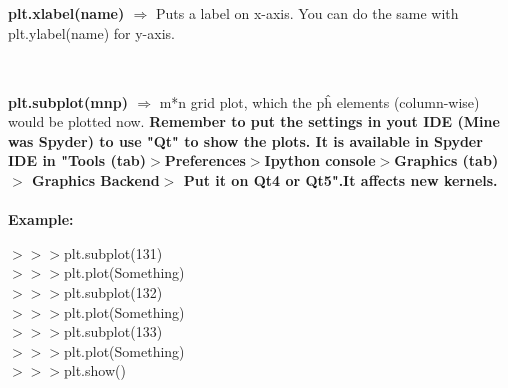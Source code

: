 \documentclass[a4paper,18pt]{article}
\begin{document}

\subsection{\colorbox {matgreen}{\color{white}{\large plt.xlabel(name)}}}
\textbf{plt.xlabel(name) $\Rightarrow$} Puts a label on x-axis. You can do the same with plt.ylabel(name) for y-axis.\\\\


\subsection{\colorbox {matgreen}{\color{white}{\large Subplots}}}
\textbf{plt.subplot(mnp) $\Rightarrow$} m*n grid plot, which the p\^{h} elements (column-wise) would be plotted now. \textbf{\textcolor{important}{Remember to put the settings in yout IDE (Mine was Spyder) to use "Qt" to show the plots. It is available in Spyder IDE in "Tools (tab)$>$Preferences$>$Ipython console$>$Graphics (tab)$>$ Graphics Backend$>$ Put it on Qt4 or Qt5".It affects new kernels.}}\\\\
\textbf{Example:\\}

$>>>$plt.subplot(131)\\

$>>>$plt.plot(Something)\\

$>>>$plt.subplot(132)\\

$>>>$plt.plot(Something)\\

$>>>$plt.subplot(133)\\

$>>>$plt.plot(Something)\\

$>>>$plt.show()\\\\


\newpage

\end{document}

